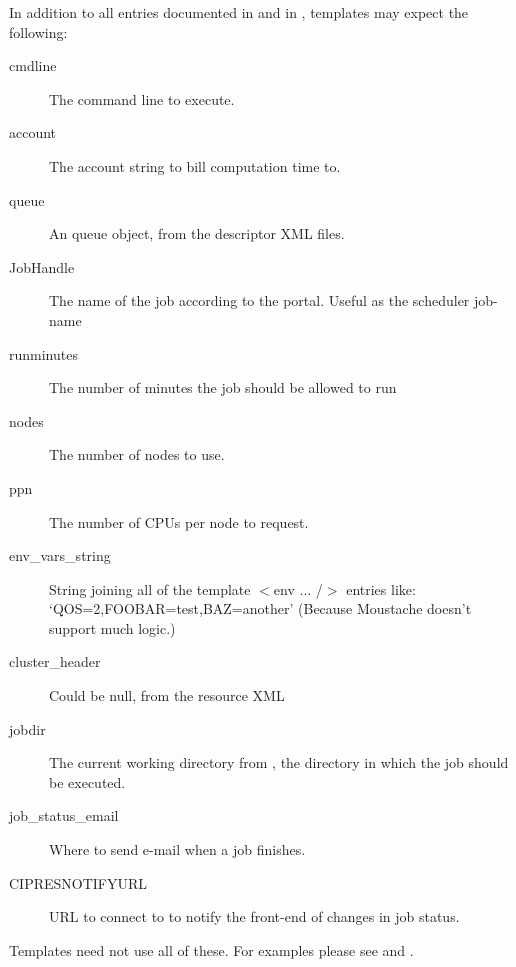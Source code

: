 In addition to all entries documented in  and in , templates may expect the following:
\begin{description}
	\item[cmdline] The command line to execute.
	\item[account] The account string to bill computation time to.
	\item[queue] An queue object, from the descriptor XML files.
	\item[JobHandle] The name of the job according to the portal. Useful as the scheduler job-name
	\item[runminutes] The number of minutes the job should be allowed to run
	\item[nodes] The number of nodes to use.
	\item[ppn] The number of CPUs per node to request.
	\item[env\_vars\_string] String joining all of the template $<$env ... /$>$ entries like: `QOS=2,FOOBAR=test,BAZ=another' (Because Moustache doesn't support much logic.)
	\item[cluster\_header] Could be null, from the resource XML
	\item[jobdir] The current working directory from \theprog, the directory in which the job should be executed.
	\item[job\_status\_email] Where to send e-mail when a job finishes.
	\item[CIPRESNOTIFYURL] URL to connect to to notify the front-end of changes in job status.
\end{description}

Templates need not use all of these. For examples please see  and .
